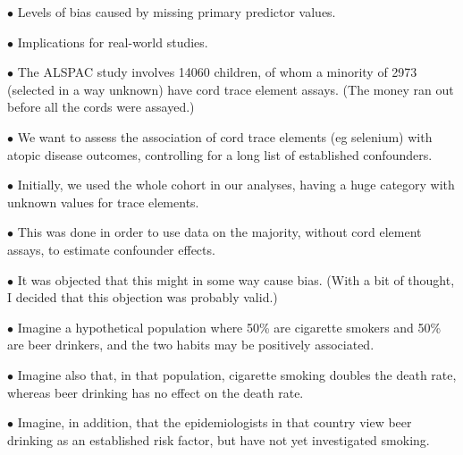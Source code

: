 \item{$\bullet$} Levels of bias caused by missing primary predictor values.

\item{$\bullet$} Implications for real-world studies.

\enditems

\vfill\eject
\medskip


\beginitems

\item{$\bullet$} The ALSPAC study involves 14060 children, of whom a minority of 2973
(selected in a way unknown) have cord trace element assays. (The money ran out
before all the cords were assayed.)

\item{$\bullet$} We want to assess the association of cord trace elements (eg selenium) with
atopic disease outcomes, controlling for a long list of established confounders.

\item{$\bullet$} Initially, we used the whole cohort in our analyses, having a huge
category with unknown values for trace elements.

\item{$\bullet$} This was done in order to use data
on the majority, without cord element assays, to estimate confounder effects.

\item{$\bullet$} It was objected that this might in some way cause bias. (With a
bit of thought, I decided that this objection was probably valid.)

\enditems

\vfill\eject
\medskip


\beginitems

\item{$\bullet$} Imagine a hypothetical population where 50\% are cigarette smokers and 50\% are beer drinkers,
and the two habits may be positively associated.

\item{$\bullet$} Imagine also that, in that population, cigarette smoking doubles the death rate,
whereas beer drinking has no effect on the death rate.

\item{$\bullet$} Imagine, in addition, that the epidemiologists in that country
view beer drinking as an established risk factor, but have not yet investigated smoking.

